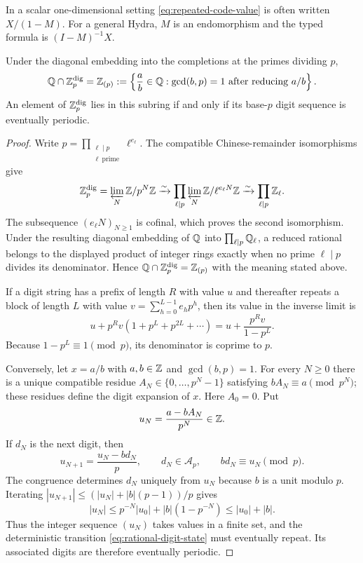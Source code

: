 \begin{remark}
In a scalar one-dimensional setting \cref{eq:repeated-code-value} is often
written $X/(1-M)$.  For a general Hydra, $M$ is an endomorphism and the typed
formula is $(I-M)^{-1}X$.
\end{remark}

\begin{proposition}
\label{prop:rational-eventually-periodic}
Under the diagonal embedding into the completions at the primes dividing
$p$,
\[
 \mathbb Q\cap\mathbb Z_p^{\mathrm{dig}}
 =\mathbb Z_{(p)}:=\left\{\frac ab\in\mathbb Q:\gcd(b,p)=1
                   \text{ after reducing }a/b\right\}.
\]
An element of $\mathbb Z_p^{\mathrm{dig}}$ lies in this subring if and only if its
base-$p$ digit sequence is eventually periodic.
\end{proposition}

\begin{proof}
Write $p=\prod_{\substack{\ell\mid p\\ \ell\ {\mathrm{prime}}}}\ell^{e_\ell}$.
The compatible Chinese-remainder
isomorphisms give
\[
 \mathbb Z_p^{\mathrm{dig}}
 =\varprojlim_N\mathbb Z/p^N\mathbb Z
 \xrightarrow{\sim}
 \prod_{\ell\mid p}\varprojlim_N\mathbb Z/\ell^{e_\ell N}\mathbb Z
 \xrightarrow{\sim}\prod_{\ell\mid p}\mathbb Z_\ell.
\]
The subsequence $(e_\ell N)_{N\geq1}$ is cofinal, which proves the second
isomorphism.  Under the resulting diagonal embedding of $\mathbb Q$ into
$\prod_{\ell\mid p}\mathbb Q_\ell$, a reduced rational belongs to the displayed
product of integer rings exactly when no prime $\ell\mid p$ divides its
denominator.  Hence
$\mathbb Q\cap\mathbb Z_p^{\mathrm{dig}}=\mathbb Z_{(p)}$ with the meaning stated above.

If a digit string has a prefix of length $R$ with value $u$ and thereafter
repeats a block of length $L$ with value
$v=\sum_{h=0}^{L-1}e_hp^h$, then its value in the inverse limit is
\[
 u+p^R v(1+p^L+p^{2L}+\cdots)
 =u+\frac{p^Rv}{1-p^L}.
\]
Because $1-p^L\equiv1\pmod p$, its denominator is coprime to $p$.

Conversely, let $x=a/b$ with $a,b\in\mathbb Z$ and $\gcd(b,p)=1$.  For every
$N\geq0$ there is a unique compatible residue
$A_N\in\{0,\ldots,p^N-1\}$ satisfying
$bA_N\equiv a\pmod{p^N}$; these residues define the digit expansion of $x$.
Here $A_0=0$.  Put
\[
 u_N=\frac{a-bA_N}{p^N}\in\mathbb Z.
\]
If $d_N$ is the next digit, then
\begin{equation}
\label{eq:rational-digit-state}
 u_{N+1}=\frac{u_N-bd_N}{p},
 \qquad
 d_N\in\mathcal A_p,\qquad bd_N\equiv u_N\pmod p.
\end{equation}
The congruence determines $d_N$ uniquely from $u_N$ because $b$ is a unit
modulo $p$.  Iterating
$|u_{N+1}|\leq(|u_N|+|b|(p-1))/p$ gives
\[
 |u_N|\leq p^{-N}|u_0|+|b|(1-p^{-N})
 \leq |u_0|+|b|.
\]
Thus the integer sequence $(u_N)$ takes values in a finite set, and the
deterministic transition
\cref{eq:rational-digit-state} must eventually repeat.  Its associated
digits are therefore eventually periodic.
\end{proof}

